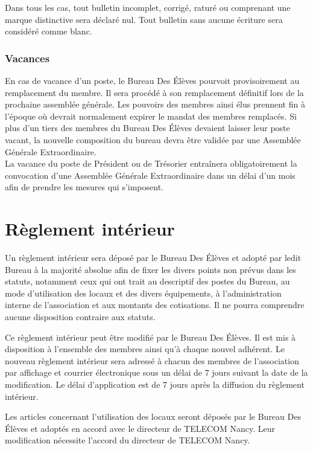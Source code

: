 \documentclass{article} %
\begin{document}
				Dans tous les cas, tout bulletin incomplet, corrigé, raturé ou
				comprenant une marque distinctive sera déclaré nul.	Tout bulletin
				sans aucune écriture sera considéré comme blanc.

			\subsubsection{Vacances}
				En cas de vacance d'un poste, le Bureau Des Élèves pourvoit
				provisoirement au remplacement du membre. Il sera procédé à son
				remplacement définitif lors de la prochaine assemblée générale. Les
				pouvoirs des membres ainsi élus prennent fin à l’époque où devrait
				normalement expirer le mandat des membres remplacés. Si plus d’un
				tiers des membres du Bureau Des Élèves devaient laisser leur poste
				vacant, la nouvelle composition du bureau devra être validée par une
				Assemblée Générale Extraordinaire.\\
				La vacance du poste de Président ou de Trésorier entraînera
				obligatoirement la convocation d’une Assemblée Générale
				Extraordinaire dans un délai d’un mois afin de prendre les mesures
				qui s’imposent.

	\section{Règlement intérieur}
		Un règlement intérieur sera déposé par le Bureau Des Élèves et adopté par
		ledit Bureau à la majorité absolue afin de fixer les divers points non prévus
		dans les statuts, notamment ceux qui ont trait au descriptif des postes du
		Bureau, au mode d’utilisation des locaux et des divers équipements, à
		l’administration interne de l’association et aux montants des cotisations. Il
		ne pourra comprendre aucune disposition contraire aux statuts.

		Ce règlement intérieur peut être modifié par le Bureau Des Élèves. Il est mis
		à disposition à l’ensemble des membres ainsi qu’à chaque nouvel adhérent. Le
		nouveau règlement intérieur sera adressé à chacun des membres de
		l'association par affichage et courrier électronique sous un délai de 7 jours
		suivant la date de la modification. Le délai d’application est de 7 jours
		après la diffusion du règlement intérieur.

		Les articles concernant l’utilisation des locaux seront déposés par le Bureau
		Des Élèves et adoptés en accord avec le directeur de TELECOM Nancy.	Leur
		modification nécessite l’accord du directeur de TELECOM Nancy.
\end{document}
